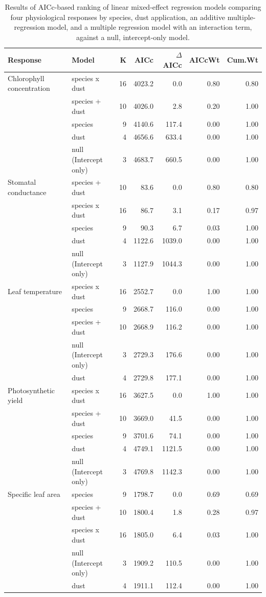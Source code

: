 \documentclass{svjour3}
\begin{document}
\begin{table}[!h]
	\centering
	\begin{tabular}{llrrrrr}
		\hline
		Response & Model & K & AICc & $\Delta$AICc & AICcWt & Cum.Wt \\ 
		\hline
		Chlorophyll concentration & species x dust & 16 & 4023.2 & 0.0 & 0.80 & 0.80 \\ 
		& species + dust & 10 & 4026.0 & 2.8 & 0.20 & 1.00 \\ 
		& species & 9 & 4140.6 & 117.4 & 0.00 & 1.00 \\ 
		& dust & 4 & 4656.6 & 633.4 & 0.00 & 1.00 \\ 
		& null (Intercept only) & 3 & 4683.7 & 660.5 & 0.00 & 1.00 \\ 
		Stomatal conductance & species + dust & 10 & 83.6 & 0.0 & 0.80 & 0.80 \\ 
		& species x dust & 16 & 86.7 & 3.1 & 0.17 & 0.97 \\ 
		& species & 9 & 90.3 & 6.7 & 0.03 & 1.00 \\ 
		& dust & 4 & 1122.6 & 1039.0 & 0.00 & 1.00 \\ 
		& null (Intercept only) & 3 & 1127.9 & 1044.3 & 0.00 & 1.00 \\ 
		Leaf temperature & species x dust & 16 & 2552.7 & 0.0 & 1.00 & 1.00 \\ 
		& species & 9 & 2668.7 & 116.0 & 0.00 & 1.00 \\ 
		& species + dust & 10 & 2668.9 & 116.2 & 0.00 & 1.00 \\ 
		& null (Intercept only) & 3 & 2729.3 & 176.6 & 0.00 & 1.00 \\ 
		& dust & 4 & 2729.8 & 177.1 & 0.00 & 1.00 \\ 
		Photosynthetic yield & species x dust & 16 & 3627.5 & 0.0 & 1.00 & 1.00 \\ 
		& species + dust & 10 & 3669.0 & 41.5 & 0.00 & 1.00 \\ 
		& species & 9 & 3701.6 & 74.1 & 0.00 & 1.00 \\ 
		& dust & 4 & 4749.1 & 1121.5 & 0.00 & 1.00 \\ 
		& null (Intercept only) & 3 & 4769.8 & 1142.3 & 0.00 & 1.00 \\ 
		Specific leaf area & species & 9 & 1798.7 & 0.0 & 0.69 & 0.69 \\ 
		& species + dust & 10 & 1800.4 & 1.8 & 0.28 & 0.97 \\ 
		& species x dust & 16 & 1805.0 & 6.4 & 0.03 & 1.00 \\ 
		& null (Intercept only) & 3 & 1909.2 & 110.5 & 0.00 & 1.00 \\ 
		& dust & 4 & 1911.1 & 112.4 & 0.00 & 1.00 \\ 
		\hline
	\end{tabular}
	\caption{Results of AICc-based ranking of linear mixed-effect regression models comparing four physiological responses by species, dust application, an additive multiple-regression model, and a multiple regression model with an interaction term, against a null, intercept-only model.} 
	\label{tab:cropAIC}
\end{table}
\end{document}
